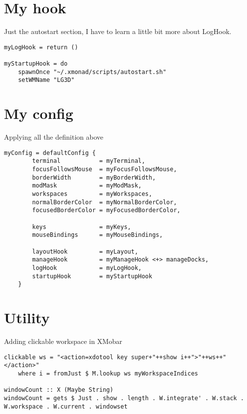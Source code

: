 \documentclass[11pt]{article}
\begin{document}
\section{My hook}
\label{sec:org1b4e6e6}
Just the autostart section, I have to learn a little bit more about LogHook.
\begin{verbatim}
myLogHook = return ()

myStartupHook = do
    spawnOnce "~/.xmonad/scripts/autostart.sh"
    setWMName "LG3D"
\end{verbatim}
\section{My config}
\label{sec:org9e2025a}
Applying all the definition above
\begin{verbatim}
myConfig = defaultConfig {
        terminal           = myTerminal,
        focusFollowsMouse  = myFocusFollowsMouse,
        borderWidth        = myBorderWidth,
        modMask            = myModMask,
        workspaces         = myWorkspaces,
        normalBorderColor  = myNormalBorderColor,
        focusedBorderColor = myFocusedBorderColor,

        keys               = myKeys,
        mouseBindings      = myMouseBindings,

        layoutHook         = myLayout,
        manageHook         = myManageHook <+> manageDocks,
        logHook            = myLogHook,
        startupHook        = myStartupHook
    }
\end{verbatim}
\section{Utility}
\label{sec:org27df371}
Adding clickable workspace in XMobar
\begin{verbatim}
clickable ws = "<action=xdotool key super+"++show i++">"++ws++"</action>"
    where i = fromJust $ M.lookup ws myWorkspaceIndices

windowCount :: X (Maybe String)
windowCount = gets $ Just . show . length . W.integrate' . W.stack . W.workspace . W.current . windowset
\end{verbatim}
\end{document}
